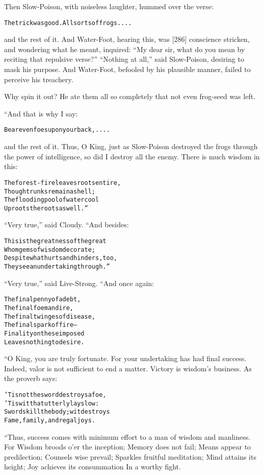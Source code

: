\documentclass{article}
\renewenvironment{verbatim}{\begin{alltt}\normalfont\begin{centering}}{\end{centering}\end{alltt}}
\begin{document}
Then Slow-Poison, with noiseless laughter, hummed over the verse:

\begin{verbatim}
The trick was good. All sorts of frogs ....
\end{verbatim}
and the rest of it. And Water-Foot, hearing this, was [286]
conscience stricken, and wondering what he meant, inquired:
``My dear sir, what do you mean by reciting that repulsive verse?''
``Nothing at all,'' said Slow-Poison, desiring to mask his purpose.
And Water-Foot, befooled by his plausible manner, failed to
perceive his treachery.

Why spin it out? He ate them all so completely that not even
frog-seed was left.

“And that is why I say:

\begin{verbatim}
Bear even foes upon your back, ....
\end{verbatim}
and the rest of it. Thus, O King, just as Slow-Poison destroyed the
frogs through the power of intelligence, so did I destroy all the
enemy. There is much wisdom in this:

\begin{verbatim}
The forest-fire leaves roots entire,
    Though trunks remain a shell;
The flooding pool of water cool
    Uproots the roots as well.”
\end{verbatim}
``Very true,'' said Cloudy. “And besides:

\begin{verbatim}
This is the greatness of the great
Whom gems of wisdom decorate;
Despite what hurts and hinders, too,
They see an undertaking through.”
\end{verbatim}
``Very true,'' said Live-Strong. “And once again:

\begin{verbatim}
The final penny of a debt,
    The final foeman dire,
The final twinges of disease,
    The final spark of fire--
Finality on these imposed
    Leaves nothing to desire.
\end{verbatim}
“O King, you are truly fortunate. For your undertaking has had
final success. Indeed, valor is not sufficient to end a matter.
Victory is wisdom's business. As the proverb says:

\begin{verbatim}
'Tis not the sword destroys a foe,
'Tis wit that utterly lays low:
Swords kill the body; wit destroys
Fame, family, and regal joys.
\end{verbatim}
“Thus, success comes with minimum effort to a man of wisdom and
manliness. For Wisdom broods o'er the inception; Memory does not
fail; Means appear to predilection; Counsels wise prevail; Sparkles
fruitful meditation; Mind attains its height; Joy achieves its
consummation In a worthy fight.
\end{document}
